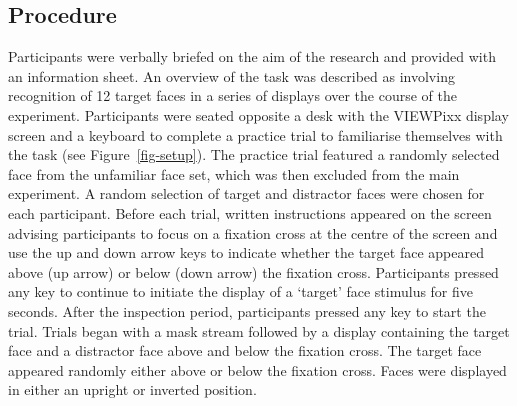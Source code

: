 \documentclass[
  authoryear,
  review,
  3p,
  onecolumn]{elsarticle}
\begin{document}
\subsection{Procedure}\label{procedure}

Participants were verbally briefed on the aim of the research and
provided with an information sheet. An overview of the task was
described as involving recognition of 12 target faces in a series of
displays over the course of the experiment. Participants were seated
opposite a desk with the VIEWPixx display screen and a keyboard to
complete a practice trial to familiarise themselves with the task (see
Figure~\ref{fig-setup}). The practice trial featured a randomly selected
face from the unfamiliar face set, which was then excluded from the main
experiment. A random selection of target and distractor faces were
chosen for each participant. Before each trial, written instructions
appeared on the screen advising participants to focus on a fixation
cross at the centre of the screen and use the up and down arrow keys to
indicate whether the target face appeared above (up arrow) or below
(down arrow) the fixation cross. Participants pressed any key to
continue to initiate the display of a `target' face stimulus for five
seconds. After the inspection period, participants pressed any key to
start the trial. Trials began with a mask stream followed by a display
containing the target face and a distractor face above and below the
fixation cross. The target face appeared randomly either above or below
the fixation cross. Faces were displayed in either an upright or
inverted position.
\end{document}
